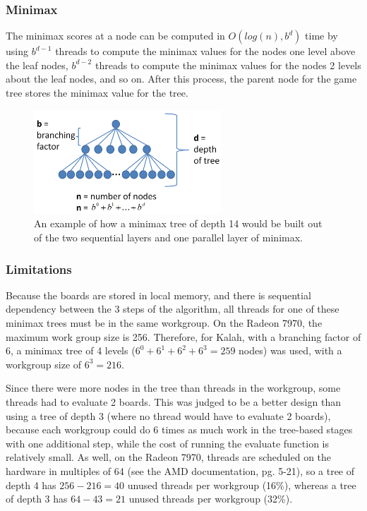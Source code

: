\documentclass{article}
\begin{document}
\subsubsection{Minimax}
The minimax scores at a node can be computed in $O(log(n),b^{d})$ time by using $b^{d-1}$ threads to compute the minimax values for the nodes one level above the leaf nodes, $b^{d-2}$ threads to compute the minimax values for the nodes 2 levels about the leaf nodes, and so on. After this process, the parent node for the game tree stores the minimax value for the tree.

\begin{figure}[ht!]
\centering
\includegraphics[width=70mm]{mankalah-terms.png}
\caption{An example of how a minimax tree of depth 14 would be built out of the two sequential layers and one parallel layer of minimax.}
\label{fig:mankalahterms}
\end{figure}

\subsubsection{Limitations}
Because the boards are stored in local memory, and there is sequential dependency between the 3 steps of the algorithm, all threads for one of these minimax trees must be in the same workgroup. On the Radeon 7970, the maximum work group size is 256. Therefore, for Kalah, with a branching factor of 6, a minimax tree of 4 levels ($6^0 + 6^1 + 6^2 + 6^3 = 259$ nodes) was used, with a workgroup size of $6^3 = 216$.

Since there were more nodes in the tree than threads in the workgroup, some threads had to evaluate 2 boards. This was judged to be a better design than using a tree of depth 3 (where no thread would have to evaluate 2 boards), because each workgroup could do 6 times as much work in the tree-based stages with one additional step, while the cost of running the evaluate function is relatively small. As well, on the Radeon 7970, threads are scheduled on the hardware in multiples of 64 (see the AMD documentation\cite{amdapp}, pg. 5-21), so a tree of depth 4 has $256 - 216 = 40$ unused threads per workgroup (16\%), whereas a tree of depth 3 has $64 - 43 = 21$ unused threads per workgroup (32\%).
\end{document}

